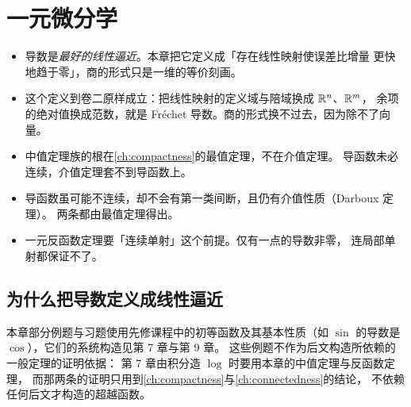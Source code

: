 \chapter{一元微分学}
\label{ch:differentiation}

\begin{keypoint}[本章要点]
  \begin{itemize}
    \item 导数是\emph{最好的线性逼近}。本章把它定义成「存在线性映射使误差比增量
          更快地趋于零」，商的形式只是一维的等价刻画。
    \item 这个定义到卷二原样成立：把线性映射的定义域与陪域换成 \(\mathbb{R}^{n}\)、\(\mathbb{R}^{m}\)，
          余项的绝对值换成范数，就是 Fréchet 导数。商的形式换不过去，因为除不了向量。
    \item 中值定理族的根在\cref{ch:compactness}的最值定理，不在介值定理。
          导函数未必连续，介值定理套不到导函数上。
    \item 导函数虽可能不连续，却不会有第一类间断，且仍有介值性质（Darboux 定理）。
          两条都由最值定理得出。
    \item 一元反函数定理要「连续单射」这个前提。仅有一点的导数非零，
          连局部单射都保证不了。
  \end{itemize}
\end{keypoint}

\section{为什么把导数定义成线性逼近}
\label{sec:why-derivative}

\begin{remark}[关于初等函数]
  本章部分例题与习题使用先修课程中的初等函数及其基本性质（如
  \(\sin\) 的导数是 \(\cos\)），它们的系统构造见第 7 章与第 9 章。
  这些例题不作为后文构造所依赖的一般定理的证明依据：
  第 7 章由积分造 \(\log\) 时要用本章的中值定理与反函数定理，
  而那两条的证明只用到\cref{ch:compactness}与\cref{ch:connectedness}的结论，
  不依赖任何后文才构造的超越函数。
\end{remark}

